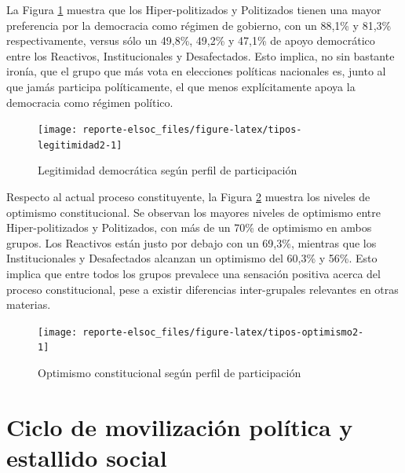 \documentclass[
  12pt,
]{book}
\begin{document}
La Figura \ref{fig:tipos-legitimidad2} muestra que los Hiper-politizados y Politizados tienen una mayor preferencia por la democracia como régimen de gobierno, con un 88,1\% y 81,3\% respectivamente, versus sólo un 49,8\%, 49,2\% y 47,1\% de apoyo democrático entre los Reactivos, Institucionales y Desafectados. Esto implica, no sin bastante ironía, que el grupo que más vota en elecciones políticas nacionales es, junto al que jamás participa políticamente, el que menos explícitamente apoya la democracia como régimen político.

\begin{figure}

{\centering \texttt{[image: reporte-elsoc\_files/figure-latex/tipos-legitimidad2-1]} 

}

\caption{Legitimidad democrática según perfil de participación}\label{fig:tipos-legitimidad2}
\end{figure}

Respecto al actual proceso constituyente, la Figura \ref{fig:tipos-optimismo2} muestra los niveles de optimismo constitucional. Se observan los mayores niveles de optimismo entre Hiper-politizados y Politizados, con más de un 70\% de optimismo en ambos grupos. Los Reactivos están justo por debajo con un 69,3\%, mientras que los Institucionales y Desafectados alcanzan un optimismo del 60,3\% y 56\%. Esto implica que entre todos los grupos prevalece una sensación positiva acerca del proceso constitucional, pese a existir diferencias inter-grupales relevantes en otras materias.

\begin{figure}

{\centering \texttt{[image: reporte-elsoc\_files/figure-latex/tipos-optimismo2-1]} 

}

\caption{Optimismo constitucional según perfil de participación}\label{fig:tipos-optimismo2}
\end{figure}

\hypertarget{ciclo-de-movilizaciuxf3n-poluxedtica-y-estallido-social}{%
\section{Ciclo de movilización política y estallido social}\label{ciclo-de-movilizaciuxf3n-poluxedtica-y-estallido-social}}
\end{document}
